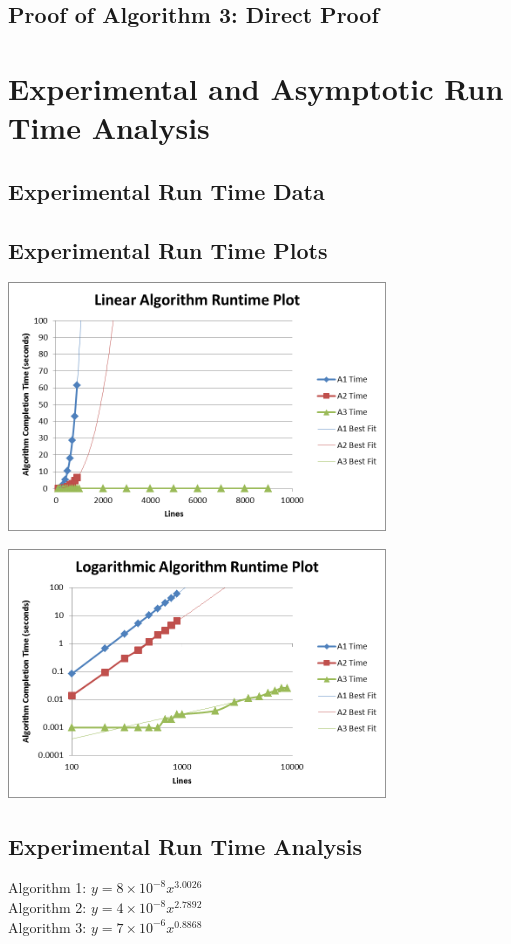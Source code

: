 \documentclass{article}
\begin{document}
\subsection*{Proof of Algorithm 3: Direct Proof}

\section*{Experimental and Asymptotic Run Time Analysis}
\subsection*{Experimental Run Time Data}


\pagebreak

\subsection*{Experimental Run Time Plots}
\centerline{\includegraphics[width=0.75\textwidth]{plot1.png}}
\centerline{\includegraphics[width=0.75\textwidth]{plot2.png}}

\pagebreak

\subsection*{Experimental Run Time Analysis}
Algorithm 1: $y=8 \times 10^{-8}x^{3.0026}$\\
Algorithm 2: $y=4 \times 10^{-8}x^{2.7892}$\\
Algorithm 3: $y=7 \times 10^{-6}x^{0.8868}$\\
\end{document}
